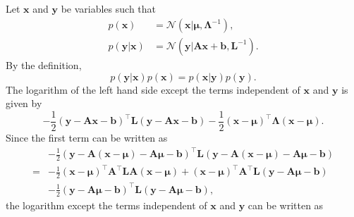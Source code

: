 \subsection{}
\label{2.32}
Let $\mathbf{x}$ and $\mathbf{y}$ be variables such that 
%
\begin{equation}
\begin{aligned}
p(\mathbf{x})
&=
\mathcal{N}
\left( 
	\mathbf{x}
	|
	\bm{\mu},
	\bm{\Lambda} ^ {- 1}
\right), 
\\
p(\mathbf{y} | \mathbf{x})
&=
\mathcal{N}
\left( 
	\mathbf{y}
	|
	\mathbf{A} 
	\mathbf{x} 
	+ 
	\mathbf{b},
	\mathbf{L} ^ {- 1}
\right).
\end{aligned}
\end{equation}
%
By the definition,
%
\begin{equation}
p(\mathbf{y} | \mathbf{x})
p(\mathbf{x})
=
p(\mathbf{x} | \mathbf{y})
p(\mathbf{y}).
\end{equation}
%
The logarithm of the left hand side except the terms independent of $\mathbf{x}$ and $\mathbf{y}$ is given by
%
\begin{equation}
- 
\frac{1}{2} 
\left( 
	\mathbf{y}
	 - 
	 \mathbf{A} 
	 \mathbf{x} 
	 - 
	 \mathbf{b} 
\right) ^ \intercal 
\mathbf{L} 
\left( 
	\mathbf{y} 
	- 
	\mathbf{A} 
	\mathbf{x} 
	- 
	\mathbf{b} 
\right) 
- 
\frac{1}{2} 
(\mathbf{x} - \bm{\mu}) ^ \intercal 
\bm{\Lambda}
(\mathbf{x} - \bm{\mu}).
\end{equation}
%
Since the first term can be written as
%
\begin{equation}
\begin{aligned}
&
- 
\frac{1}{2} 
\left( 
	\mathbf{y}
	 - 
	 \mathbf{A} 
	 (\mathbf{x} - \bm{\mu})
	 - 
	 \mathbf{A} 
	 \bm{\mu}
	 - 
	 \mathbf{b} 
\right) ^ \intercal 
\mathbf{L} 
\left( 
	\mathbf{y}
	 - 
	 \mathbf{A} 
	 (\mathbf{x} - \bm{\mu})
	 - 
	 \mathbf{A} 
	 \bm{\mu}
	 - 
	 \mathbf{b} 
\right) 
\\
=&
- 
\frac{1}{2}
(\mathbf{x} - \bm{\mu}) ^ \intercal
\mathbf{A} ^ \intercal
\mathbf{L}
\mathbf{A}
(\mathbf{x} - \bm{\mu})
+
(\mathbf{x} - \bm{\mu}) ^ \intercal
\mathbf{A} ^ \intercal
\mathbf{L}
(\mathbf{y} - \mathbf{A} \bm{\mu} - \mathbf{b}) 
\\
&-
\frac{1}{2}
(\mathbf{y} - \mathbf{A} \bm{\mu} - \mathbf{b}) ^ \intercal
\mathbf{L}
(\mathbf{y} - \mathbf{A} \bm{\mu} - \mathbf{b}),
\end{aligned}
\end{equation}
%
the logarithm except the terms independent of $\mathbf{x}$ and $\mathbf{y}$ can be written as
%
